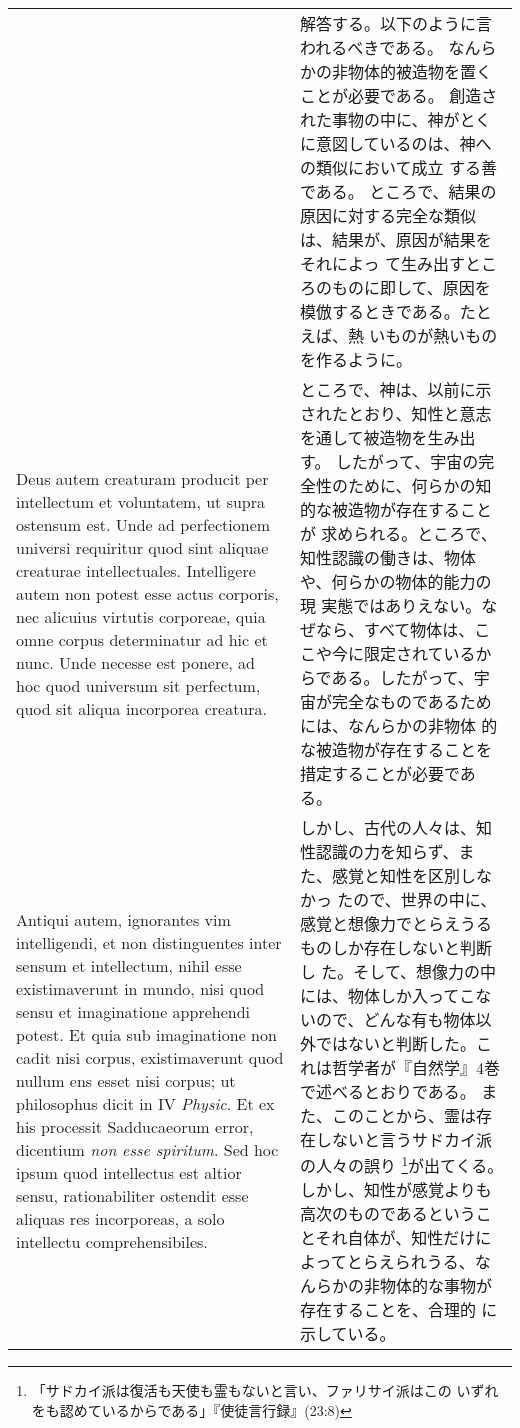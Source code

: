 \documentclass[10pt]{jsarticle} %
\begin{document}
\begin{longtable}{p{21em}p{21em}}
&

解答する。以下のように言われるべきである。
なんらかの非物体的被造物を置くことが必要である。
創造された事物の中に、神がとくに意図しているのは、神への類似において成立
 する善である。
ところで、結果の原因に対する完全な類似は、結果が、原因が結果をそれによっ
 て生み出すところのものに即して、原因を模倣するときである。たとえば、熱
 いものが熱いものを作るように。

\\



Deus autem creaturam producit per
intellectum et voluntatem, ut supra ostensum est. Unde ad perfectionem
universi requiritur quod sint aliquae creaturae
intellectuales. Intelligere autem non potest esse actus corporis, nec
alicuius virtutis corporeae, quia omne corpus determinatur ad hic et
nunc. Unde necesse est ponere, ad hoc quod universum sit perfectum, quod
sit aliqua incorporea creatura. 


&


ところで、神は、以前に示されたとおり、知性と意志を通して被造物を生み出す。
 したがって、宇宙の完全性のために、何らかの知的な被造物が存在することが
 求められる。ところで、知性認識の働きは、物体や、何らかの物体的能力の現
 実態ではありえない。なぜなら、すべて物体は、ここや今に限定されているか
 らである。したがって、宇宙が完全なものであるためには、なんらかの非物体
 的な被造物が存在することを措定することが必要である。

\\




Antiqui autem, ignorantes vim intelligendi, et non distinguentes inter
sensum et intellectum, nihil esse existimaverunt in mundo, nisi quod
sensu et imaginatione apprehendi potest. Et quia sub imaginatione non
cadit nisi corpus, existimaverunt quod nullum ens esset nisi corpus; ut
philosophus dicit in IV {\itshape Physic}. Et ex his processit
Sadducaeorum error, dicentium {\itshape non esse spiritum}. Sed hoc
ipsum quod intellectus est altior sensu, rationabiliter ostendit esse
aliquas res incorporeas, a solo intellectu comprehensibiles.


&

しかし、古代の人々は、知性認識の力を知らず、また、感覚と知性を区別しなかっ
 たので、世界の中に、感覚と想像力でとらえうるものしか存在しないと判断し
 た。そして、想像力の中には、物体しか入ってこないので、どんな有も物体以
 外ではないと判断した。これは哲学者が『自然学』4巻で述べるとおりである。
また、このことから、霊は存在しないと言うサドカイ派の人々の誤り
 \footnote{「サドカイ派は復活も天使も霊もないと言い、ファリサイ派はこの
 いずれをも認めているからである」『使徒言行録』(23:8)}が出てくる。
しかし、知性が感覚よりも高次のものであるということそれ自体が、知性だけに
 よってとらえられうる、なんらかの非物体的な事物が存在することを、合理的
 に示している。


\end{longtable}
\end{document}
